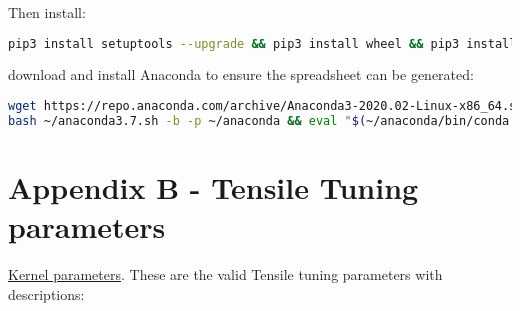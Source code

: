 \documentclass[]{article}
\begin{document}
\noindent Then install:

\begin{lstlisting}[language=bash,breaklines=true]
pip3 install setuptools --upgrade && pip3 install wheel && pip3 install pyyaml msgpack
\end{lstlisting}

\noindent download and install Anaconda to ensure the spreadsheet can be generated:

\begin{lstlisting}[language=bash,breaklines=true]
wget https://repo.anaconda.com/archive/Anaconda3-2020.02-Linux-x86_64.sh -O ~/anaconda3.7.sh && \
bash ~/anaconda3.7.sh -b -p ~/anaconda && eval "$(~/anaconda/bin/conda shell.bash hook)"
\end{lstlisting}

\section{Appendix B - Tensile Tuning parameters}
\label{sec:appendixB}

\href{https://github.com/ROCmSoftwarePlatform/Tensile/wiki/Kernel-Parameters}{Kernel parameters}.
These are the valid Tensile tuning parameters with descriptions:
\end{document}

